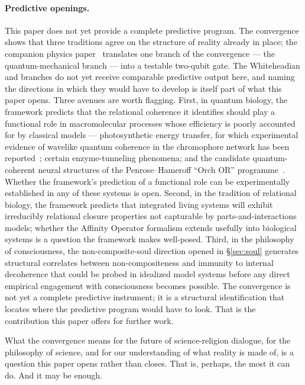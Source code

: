\paragraph{Predictive openings.}
This paper does not yet provide a complete predictive program.
The convergence shows that three traditions agree on the structure of
reality already in place; the companion physics
paper~\citep{Adams2026Physics} translates one branch of the convergence
--- the quantum-mechanical branch --- into a testable two-qubit gate.
The Whiteheadian and \bahai branches do not yet receive comparable
predictive output here, and naming the directions in which they would
have to develop is itself part of what this paper opens.
Three avenues are worth flagging.
First, in quantum biology, the framework predicts that the relational
coherence it identifies should play a functional role in macromolecular
processes whose efficiency is poorly accounted for by classical models
--- photosynthetic energy transfer, for which experimental evidence of
wavelike quantum coherence in the chromophore network has been
reported~\citep{Engel2007}; certain enzyme-tunneling phenomena; and the
candidate quantum-coherent neural structures of the Penrose--Hameroff
``Orch OR'' programme~\citep{HameroffPenrose2014}.
Whether the framework's prediction of a functional role can be
experimentally established in any of these systems is open.
Second, in the tradition of relational biology, the framework predicts
that integrated living systems will exhibit irreducibly relational
closure properties not capturable by parts-and-interactions models;
whether the Affinity Operator formalism extends usefully into biological
systems is a question the framework makes well-posed.
Third, in the philosophy of consciousness, the non-composite-soul
direction opened in \S\ref{sec:soul} generates structural correlates
between non-compositeness and immunity to internal decoherence that
could be probed in idealized model systems before any direct empirical
engagement with consciousness becomes possible.
The convergence is not yet a complete predictive instrument; it is a
structural identification that locates where the predictive program
would have to look.
That is the contribution this paper offers for further work.

What the convergence means for the future of science-religion dialogue, for the
philosophy of science, and for our understanding of what reality is made of, is
a question this paper opens rather than closes.
That is, perhaps, the most it can do.
And it may be enough.
